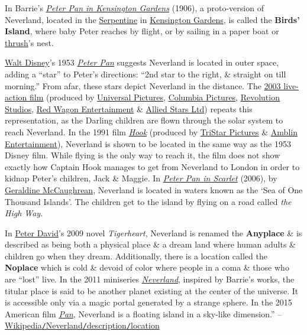 \documentclass[oneside]{book}
\numberwithin{equation}{section}
\begin{document}
In Barrie's \href{https://en.wikipedia.org/wiki/Peter_Pan_in_Kensington_Gardens}{\textit{Peter Pan in Kensington Gardens}} (1906), a proto-version of Neverland, located in the \href{https://en.wikipedia.org/wiki/The_Serpentine}{Serpentine} in \href{https://en.wikipedia.org/wiki/Kensington_Gardens}{Kensington Gardens}, is called the \textbf{Birds' Island}, where baby Peter reaches by flight, or by sailing in a paper boat or \href{https://en.wikipedia.org/wiki/Thrush_(bird)}{thrush}'s nest.

\href{https://en.wikipedia.org/wiki/Walt_Disney}{Walt Disney}'s 1953 \href{https://en.wikipedia.org/wiki/Peter_Pan_(1953_film)}{\textit{Peter Pan}} suggests Neverland is located in outer space, adding a ``star'' to Peter's directions: ``2nd star to the right, \& straight on till morning.'' From afar, these stars depict Neverland in the distance. The \href{https://en.wikipedia.org/wiki/Peter_Pan_(2003_film)}{2003 live-action film} (produced by \href{https://en.wikipedia.org/wiki/Universal_Pictures}{Universal Pictures}, \href{https://en.wikipedia.org/wiki/Columbia_Pictures}{Columbia Pictures}, \href{https://en.wikipedia.org/wiki/Revolution_Studios}{Revolution Studios}, \href{https://en.wikipedia.org/wiki/Red_Wagon_Entertainment}{Red Wagon Entertainment} \& \href{https://en.wikipedia.org/wiki/Allied_Stars_Ltd}{Allied Stars Ltd}) repeats this representation, as the Darling children are flown through the solar system to reach Neverland. In the 1991 film \href{https://en.wikipedia.org/wiki/Hook_(film)}{\textit{Hook}} (produced by \href{https://en.wikipedia.org/wiki/TriStar_Pictures}{TriStar Pictures} \& \href{https://en.wikipedia.org/wiki/Amblin_Entertainment}{Amblin Entertainment}), Neverland is shown to be located in the same way as the 1953 Disney film. While flying is the only way to reach it, the film does not show exactly how Captain Hook manages to get from Neverland to London in order to kidnap Peter's children, Jack \& Maggie. In \href{https://en.wikipedia.org/wiki/Peter_Pan_in_Scarlet}{\textit{Peter Pan in Scarlet}} (2006), by \href{https://en.wikipedia.org/wiki/Geraldine_McCaughrean}{Geraldine McCaughrean}, Neverland is located in waters known as the `Sea of One Thousand Islands'. The children get to the island by flying on a road called \textit{the High Way}.

In \href{https://en.wikipedia.org/wiki/Peter_David}{Peter David}'s 2009 novel \textit{Tigerheart}, Neverland is renamed the \textbf{Anyplace} \& is described as being both a physical place \& a dream land where human adults \& children go when they dream. Additionally, there is a location called the \textbf{Noplace} which is cold \& devoid of color where people in a coma \& those who are ``lost'' live. In the 2011 miniseries \href{https://en.wikipedia.org/wiki/Neverland_(miniseries)}{\textit{Neverland}}, inspired by Barrie's works, the titular place is said to be another planet existing at the center of the universe. It is accessible only via a magic portal generated by a strange sphere. In the 2015 American film \href{https://en.wikipedia.org/wiki/Pan_(2015_film)}{\textit{Pan}}, Neverland is a floating island in a sky-like dimension.'' -- \href{https://en.wikipedia.org/wiki/Neverland#Location}{Wikipedia\texttt{/}Neverland\texttt{/}description\texttt{/}location}
\end{document}
